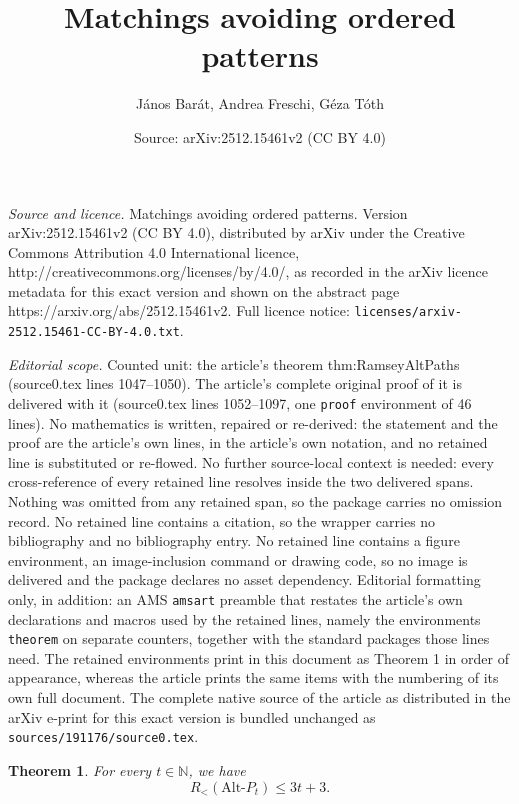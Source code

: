 \documentclass[10pt,a4paper]{amsart}
\title{Matchings avoiding ordered patterns}
\author{J\'anos Bar\'at, Andrea Freschi, G\'eza T\'oth}
\date{Source: arXiv:2512.15461v2 (CC BY 4.0)}
\newtheorem{theorem}{Theorem}
\begin{document}
\maketitle

\noindent\emph{Source and licence.} Matchings avoiding ordered patterns. Version arXiv:2512.15461v2 (CC BY 4.0), distributed by arXiv under the Creative Commons Attribution 4.0 International licence, http://creativecommons.org/licenses/by/4.0/, as recorded in the arXiv licence metadata for this exact version and shown on the abstract page https://arxiv.org/abs/2512.15461v2. Full licence notice: \texttt{licenses/arxiv-2512.15461-CC-BY-4.0.txt}.\par\smallskip

\noindent\textit{Editorial scope.} Counted unit: the article's theorem thm:RamseyAltPaths (source0.tex lines 1047--1050). The article's complete original proof of it is delivered with it (source0.tex lines 1052--1097, one \texttt{proof} environment of 46 lines). No mathematics is written, repaired or re-derived: the statement and the proof are the article's own lines, in the article's own notation, and no retained line is substituted or re-flowed.  No further source-local context is needed: every cross-reference of every retained line resolves inside the two delivered spans.  Nothing was omitted from any retained span, so the package carries no omission record.  No retained line contains a citation, so the wrapper carries no bibliography and no bibliography entry.  No retained line contains a figure environment, an image-inclusion command or drawing code, so no image is delivered and the package declares no asset dependency.  Editorial formatting only, in addition: an AMS \texttt{amsart} preamble that restates the article's own declarations and macros used by the retained lines, namely the environments \texttt{theorem} on separate counters, together with the standard packages those lines need.  The retained environments print in this document as Theorem 1 in order of appearance, whereas the article prints the same items with the numbering of its own full document.  The complete native source of the article as distributed in the arXiv e-print for this exact version is bundled unchanged as \texttt{sources/191176/source0.tex}.
\begin{theorem}\label{thm:RamseyAltPaths}
For every $t\in\mathbb N$, we have
$$R_<(\text{Alt-}P_{t})\le3t+3.$$    
\end{theorem}
\end{document}
